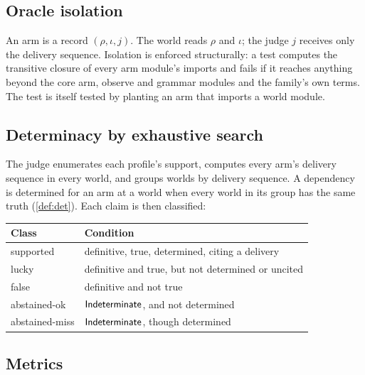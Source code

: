 \subsection{Oracle isolation}

An arm is a record $(\rho, \iota, j)$. The world reads $\rho$ and $\iota$; the judge $j$ receives only the delivery sequence. Isolation is enforced structurally: a test computes the transitive closure of every arm module's imports and fails if it reaches anything beyond the core arm, observe and grammar modules and the family's own terms. The test is itself tested by planting an arm that imports a world module.

\subsection{Determinacy by exhaustive search}

The judge enumerates each profile's support, computes every arm's delivery sequence in every world, and groups worlds by delivery sequence. A dependency is determined for an arm at a world when every world in its group has the same truth (\cref{def:det}). Each claim is then classified:

\begin{center}
\small
\begin{tabular}{@{}ll@{}}
\toprule
Class & Condition \\
\midrule
supported & definitive, true, determined, citing a delivery \\
lucky & definitive and true, but not determined or uncited \\
false & definitive and not true \\
abstained-ok & $\mathsf{Indeterminate}$, and not determined \\
abstained-miss & $\mathsf{Indeterminate}$, though determined \\
\bottomrule
\end{tabular}
\end{center}

\subsection{Metrics}

